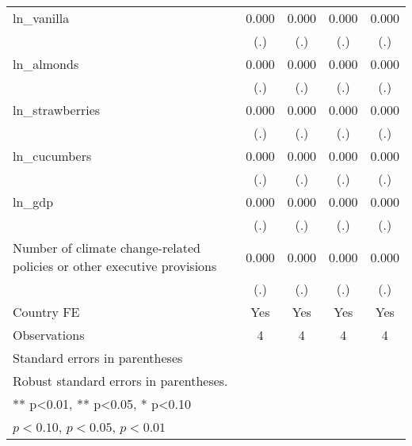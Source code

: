 \begin{table}[htbp]
\begin{tabular}{l*{4}{c}}
\addlinespace
ln\_vanilla          &       0.000         &       0.000         &       0.000         &       0.000         \\
                    &         (.)         &         (.)         &         (.)         &         (.)         \\
\addlinespace
ln\_almonds          &       0.000         &       0.000         &       0.000         &       0.000         \\
                    &         (.)         &         (.)         &         (.)         &         (.)         \\
\addlinespace
ln\_strawberries     &       0.000         &       0.000         &       0.000         &       0.000         \\
                    &         (.)         &         (.)         &         (.)         &         (.)         \\
\addlinespace
ln\_cucumbers        &       0.000         &       0.000         &       0.000         &       0.000         \\
                    &         (.)         &         (.)         &         (.)         &         (.)         \\
\addlinespace
ln\_gdp              &       0.000         &       0.000         &       0.000         &       0.000         \\
                    &         (.)         &         (.)         &         (.)         &         (.)         \\
\addlinespace
Number of climate change-related policies or other executive provisions&       0.000         &       0.000         &       0.000         &       0.000         \\
                    &         (.)         &         (.)         &         (.)         &         (.)         \\
\addlinespace
Country FE          &         Yes         &         Yes         &         Yes         &         Yes         \\
\midrule
Observations        &           4         &           4         &           4         &           4         \\
\bottomrule
\multicolumn{5}{l}{\footnotesize Standard errors in parentheses}\\
\multicolumn{5}{l}{\footnotesize Robust standard errors in parentheses.}\\
\multicolumn{5}{l}{\footnotesize *** p<0.01, ** p<0.05, * p<0.10}\\
\multicolumn{5}{l}{\footnotesize \sym{*} \(p<0.10\), \sym{**} \(p<0.05\), \sym{***} \(p<0.01\)}\\
\end{tabular}
\end{table}
